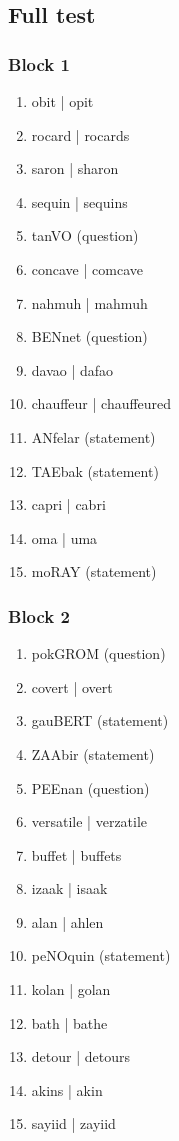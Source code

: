 \documentclass[a4paper]{article}
\begin{document}
\subsection{Full test}
\label{full}
\subsubsection{Block 1}
\begin{enumerate}

  \item obit | opit
  \item rocard | rocards
  \item saron | sharon
  \item sequin | sequins
\item tanVO (question)
  \item concave | comcave
  \item nahmuh | mahmuh
\item BENnet (question)
  \item davao | dafao
  \item chauffeur | chauffeured
\item ANfelar (statement)
\item TAEbak (statement)
  \item capri | cabri
  \item oma | uma
\item moRAY (statement)
\end{enumerate}

\subsubsection{Block 2}
\begin{enumerate}

\item pokGROM (question)
  \item covert | overt
\item gauBERT (statement)
\item ZAAbir (statement)
\item PEEnan (question)
 \item versatile | verzatile
  \item buffet | buffets
  \item izaak | isaak
  \item alan | ahlen
\item peNOquin (statement)
 \item kolan | golan
  \item bath | bathe
  \item detour | detours
  \item akins | akin
  \item sayiid | zayiid


\end{enumerate}
\end{document}
